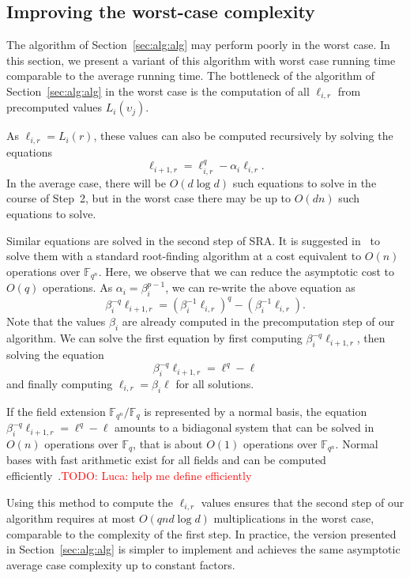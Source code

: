 \documentclass{sig-alternate}
\newcommand{\ff}[1]{\mathbb{F}_{#1}}
\newcommand{\fq}{\ff{q}}
\newcommand{\fqn}{\ff{q^n}}
\newcounter{algo}
\newcommand{\todo}[1]{\textcolor{red}{TODO: #1}}
\begin{document}
 







\subsection{Improving the worst-case complexity\label{sec:ext:variant}}

The algorithm of Section~\ref{sec:alg:alg} may perform poorly in the worst case. In this section, we present a variant of this algorithm with worst case running time comparable to the average running time.
%
The bottleneck of the algorithm of Section~\ref{sec:alg:alg} in the worst case is the computation of all $\ell_{i,r}$ from precomputed values $L_i(\upsilon_j)$.

As $\ell_{i,r}=L_i(r)$, these values can also be computed recursively by solving the equations
$$\ell_{i+1,r}=\ell_{i,r}^q-\alpha_i\ell_{i,r}.$$
%
In the average case, there will be $O(d\log d)$ such equations to solve in the course of Step~2, but in the worst case there may be up to $O(dn)$ such equations to solve.

Similar equations are solved in the second step of SRA. It is suggested in~\cite{cgUCL-P14} to solve them with a standard root-finding algorithm at a cost equivalent to $O(n)$ operations over $\fqn$.
Here, we observe that we can reduce the asymptotic cost to $O(q)$ operations. As $\alpha_i=\beta_i^{p-1}$, we can re-write the above equation as 
$$\beta_i^{-q}\ell_{i+1,r}=(\beta_i^{-1}\ell_{i,r})^q-(\beta_i^{-1}\ell_{i,r}).$$ 
Note that the values $\beta_i$ are already computed in the precomputation step of our algorithm. We can solve the first equation by first computing $\beta_i^{-q}\ell_{i+1,r}$, then solving the equation 
$$\beta_i^{-q}\ell_{i+1,r}=\ell^q-\ell$$
and finally computing $\ell_{i,r}=\beta_i\ell$ for all solutions.

If the field extension $\fqn/\fq$ is represented by a normal basis, the equation $\beta_i^{-q}\ell_{i+1,r}=\ell^q-\ell$ amounts to a bidiagonal system that can be solved in $O(n)$ operations over $\fq$, that is about $O(1)$ operations over $\fqn$.
%
Normal bases with fast arithmetic exist for all fields and can be computed efficiently~\cite{Couveignes-Lercier}.\todo{Luca: help me define efficiently}

Using this method to compute the $\ell_{i,r}$ values ensures that the second step of our algorithm requires at most $O(qnd\log d)$ multiplications in the worst case, comparable to the complexity of the first step.
%
In practice, the version presented in Section~\ref{sec:alg:alg} is simpler to implement and achieves the same asymptotic average case complexity up to constant factors. 
\end{document}

